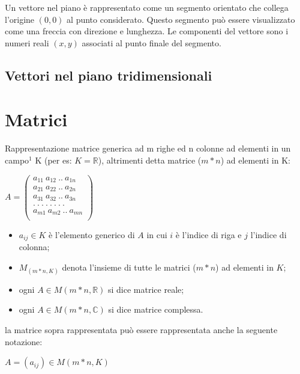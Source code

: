 \documentclass{report}
\begin{document}
Un vettore nel piano è rappresentato come un segmento orientato che collega l'origine $(0, 0)$ al punto considerato. Questo segmento può essere visualizzato come una freccia con direzione e lunghezza. Le componenti del vettore sono i numeri reali $(x, y)$ associati al punto finale del segmento.


\subsection{Vettori nel piano tridimensionali}

\section{Matrici}
Rappresentazione matrice generica ad m righe ed n colonne ad elementi in un campo$^1$ K (per es: $K = \mathbb{R}$), altrimenti detta matrice ($m * n$) ad elementi in K:

$ A = \begin{pmatrix}
  a_{11}\ a_{12} \ .. \ a_{1n}\\
  a_{21}\ a_{22} \ .. \ a_{2n}\\
  a_{31}\ a_{32} \ .. \ a_{3n}\\
  . \ . \ . \ . \ . \ . \ .\ . \ \\
  a_{m1}\ a_{m2} \ .. \ a_{mn} \\
\end{pmatrix}$

\begin{itemize}
  \item $a_{ij} \in K$ è l'elemento generico di $A$ in cui $i$ è l'indice di riga e $j$ l'indice di colonna;
  \item $M_{(m*n,K)}$ denota l'insieme di tutte le matrici ($m * n $) ad elementi in $K$;
  \item ogni $A \in M(m * n, \mathbb{R})$ si dice matrice reale;
  \item ogni $A \in M(m * n, \mathbb{C})$ si dice matrice complessa.
\end{itemize}

la matrice sopra rappresentata può essere rappresentata anche la seguente notazione:

$A = (a_{ij}) \in M(m * n,K)$

\end{document}
